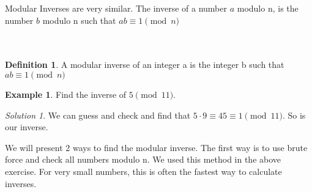 \documentclass[letterpaper]{article}
\theoremstyle{plain}
\theoremstyle{definition}
\newtheorem{definition}[thm]{Definition}
\newtheorem{example}[thm]{Example}
\theoremstyle{remark}
\newtheorem*{solution}{Solution}
\begin{document}
Modular Inverses are very similar. The inverse of a number $a$ modulo n, is the number $b$ modulo n such that $ab \equiv 1 \pmod{n}$\\\\\\
\begin{mdframed}
    \begin{definition} 
        A modular inverse of an integer a is the integer b such that $ab \equiv 1 \pmod{n}$
    \end{definition}
\end{mdframed}
\begin{mdframed}
    \begin{example}
        Find the inverse of $5 \pmod{11}$.  
    \end{example}  
\end{mdframed}
\begin{solution}
     We can guess and check and find that $5\cdot 9\equiv 45 \equiv 1 \pmod{11}$. So  is our inverse.
\end{solution}

We will present 2 ways to find the modular inverse. 
The first way is to use brute force and check all numbers modulo n. We used this
method in the above exercise. For very small numbers, this is often the fastest way to calculate inverses.
\end{document}

